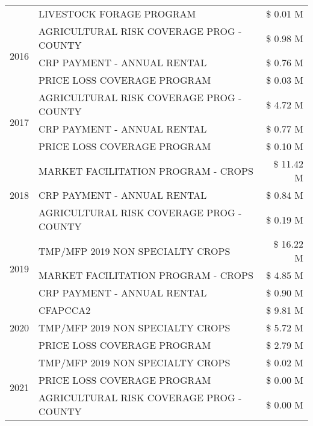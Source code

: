 \begin{tabular}{llr}
 & LIVESTOCK FORAGE PROGRAM & \$ 0.01 M \\
\cline{1-3}
\multirow[t]{3}{*}{2016} & AGRICULTURAL RISK COVERAGE PROG - COUNTY      & \$ 0.98 M \\
 & CRP PAYMENT - ANNUAL RENTAL                   & \$ 0.76 M \\
 & PRICE LOSS COVERAGE PROGRAM                   & \$ 0.03 M \\
\cline{1-3}
\multirow[t]{3}{*}{2017} & AGRICULTURAL RISK COVERAGE PROG - COUNTY & \$ 4.72 M \\
 & CRP PAYMENT - ANNUAL RENTAL & \$ 0.77 M \\
 & PRICE LOSS COVERAGE PROGRAM & \$ 0.10 M \\
\cline{1-3}
\multirow[t]{3}{*}{2018} & MARKET FACILITATION PROGRAM - CROPS & \$ 11.42 M \\
 & CRP PAYMENT - ANNUAL RENTAL & \$ 0.84 M \\
 & AGRICULTURAL RISK COVERAGE PROG - COUNTY & \$ 0.19 M \\
\cline{1-3}
\multirow[t]{3}{*}{2019} & TMP/MFP 2019 NON SPECIALTY CROPS & \$ 16.22 M \\
 & MARKET FACILITATION PROGRAM - CROPS & \$ 4.85 M \\
 & CRP PAYMENT - ANNUAL RENTAL & \$ 0.90 M \\
\cline{1-3}
\multirow[t]{3}{*}{2020} & CFAPCCA2 & \$ 9.81 M \\
 & TMP/MFP 2019 NON SPECIALTY CROPS & \$ 5.72 M \\
 & PRICE LOSS COVERAGE PROGRAM & \$ 2.79 M \\
\cline{1-3}
\multirow[t]{3}{*}{2021} & TMP/MFP 2019 NON SPECIALTY CROPS & \$ 0.02 M \\
 & PRICE LOSS COVERAGE PROGRAM & \$ 0.00 M \\
 & AGRICULTURAL RISK COVERAGE PROG - COUNTY & \$ 0.00 M \\
\cline{1-3}
\bottomrule
\end{tabular}
